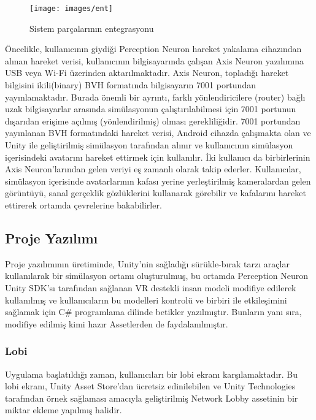 \documentclass[a4paper, 12pt, titlepage]{article}
\begin{document}
\begin{figure}[ht!]
    \centering
        \texttt{[image: images/ent]}
    \caption{Sistem parçalarının entegrasyonu}
    \label{ent}
\end{figure}

Öncelikle, kullanıcının giydiği Perception Neuron hareket yakalama cihazından alınan hareket
verisi, kullanıcının bilgisayarında çalışan Axis Neuron yazılımına USB veya Wi-Fi üzerinden
aktarılmaktadır. Axis Neuron, topladığı hareket bilgisini ikili(binary) BVH formatında bilgisayarın
7001 portundan yayınlamaktadır. Burada önemli bir ayrıntı, farklı yönlendiricilere (router) bağlı
uzak bilgisayarlar arasında simülasyonun çalıştırılabilmesi için 7001 portunun dışarıdan erişime
açılmış (yönlendirilmiş) olması gerekliliğidir. 7001 portundan yayınlanan BVH formatındaki hareket
verisi, Android cihazda çalışmakta olan ve Unity ile geliştirilmiş simülasyon tarafından alınır ve
kullanıcının simülasyon içerisindeki avatarını hareket ettirmek için kullanılır. İki kullanıcı da
birbirlerinin Axis Neuron’larından gelen veriyi eş zamanlı olarak takip ederler. Kullanıcılar,
simülasyon içerisinde avatarlarının kafası yerine yerleştirilmiş kameralardan gelen görüntüyü,
sanal gerçeklik gözlüklerini kullanarak görebilir ve kafalarını hareket ettirerek ortamda
çevrelerine bakabilirler.

\subsection{Proje Yazılımı}

Proje yazılımının üretiminde, Unity’nin sağladığı sürükle-bırak tarzı araçlar kullanılarak bir
simülasyon ortamı oluşturulmuş, bu ortamda Perception Neuron Unity SDK’sı tarafından sağlanan VR
destekli insan modeli modifiye edilerek kullanılmış ve kullanıcıların bu modelleri kontrolü ve
birbiri ile etkileşimini sağlamak için C\# programlama dilinde betikler yazılmıştır. Bunların yanı
sıra, modifiye edilmiş kimi hazır Assetlerden de faydalanılmıştır.

\subsubsection{Lobi}
Uygulama başlatıldığı zaman, kullanıcıları bir lobi ekranı karşılamaktadır. Bu lobi ekranı, Unity
Asset Store’dan ücretsiz edinilebilen ve Unity Technologies tarafından örnek sağlaması amacıyla
geliştirilmiş Network Lobby assetinin bir miktar ekleme yapılmış halidir.
\end{document}
